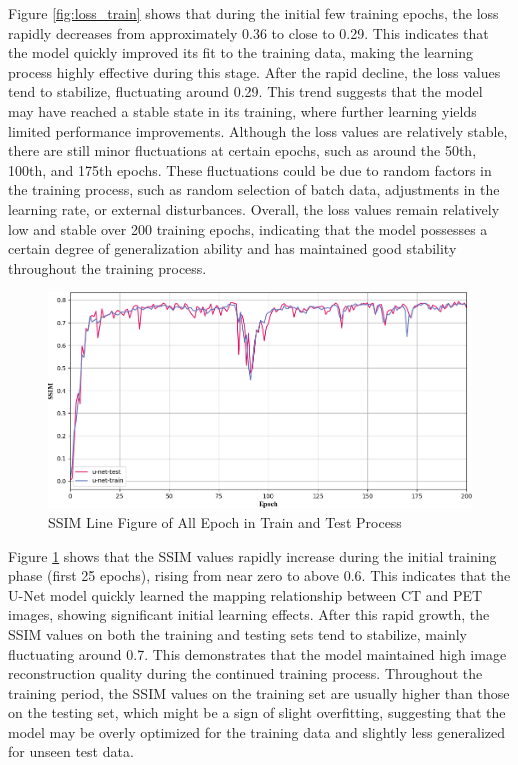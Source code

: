 \documentclass[twocolumn]{article}
\begin{document}
Figure \ref{fig:loss_train} shows that during the initial few training epochs, the loss rapidly decreases from approximately 0.36 to close to 0.29. This indicates that the model quickly improved its fit to the training data, making the learning process highly effective during this stage. After the rapid decline, the loss values tend to stabilize, fluctuating around 0.29. This trend suggests that the model may have reached a stable state in its training, where further learning yields limited performance improvements. Although the loss values are relatively stable, there are still minor fluctuations at certain epochs, such as around the 50th, 100th, and 175th epochs. These fluctuations could be due to random factors in the training process, such as random selection of batch data, adjustments in the learning rate, or external disturbances. Overall, the loss values remain relatively low and stable over 200 training epochs, indicating that the model possesses a certain degree of generalization ability and has maintained good stability throughout the training process.


\begin{figure}[h]
	\centering
	\includegraphics[width=1.0\linewidth]{u-net/SSIM}
	\caption[ssim]{SSIM Line Figure of All Epoch in Train and Test Process}
	\label{fig:ssim}
\end{figure}

Figure \ref{fig:ssim} shows that the SSIM values rapidly increase during the initial training phase (first 25 epochs), rising from near zero to above 0.6. This indicates that the U-Net model quickly learned the mapping relationship between CT and PET images, showing significant initial learning effects. After this rapid growth, the SSIM values on both the training and testing sets tend to stabilize, mainly fluctuating around 0.7. This demonstrates that the model maintained high image reconstruction quality during the continued training process. Throughout the training period, the SSIM values on the training set are usually higher than those on the testing set, which might be a sign of slight overfitting, suggesting that the model may be overly optimized for the training data and slightly less generalized for unseen test data.
\end{document}
